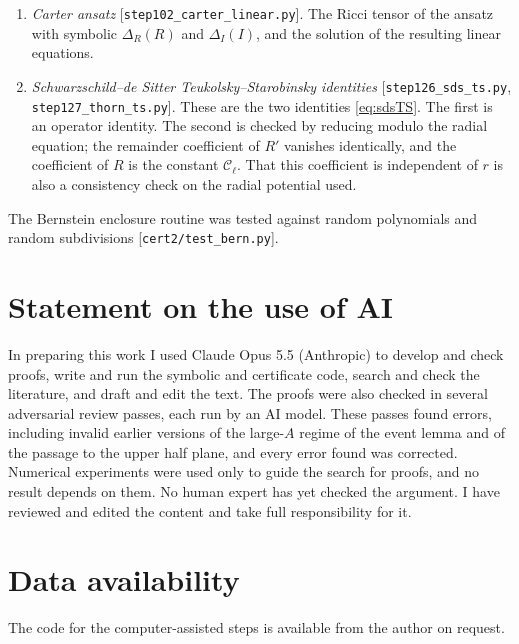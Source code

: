 \documentclass[11pt]{amsart}
\theoremstyle{definition}
\theoremstyle{remark}
\numberwithin{equation}{section}
\begin{document}
\begin{enumerate}[label=C\arabic*.,leftmargin=*]
\texttt{step96\_zeta.py}, \texttt{step97\_r5\_pd\_check.py}]. These are checks of identities that are already
derived by hand; the derivations do not depend on them.
\item \emph{Carter ansatz} [\texttt{step102\_carter\_linear.py}]. The Ricci tensor of the ansatz with symbolic
$\Delta_R(R)$ and $\Delta_I(I)$, and the solution of the resulting linear equations.
\item \emph{Schwarzschild--de Sitter Teukolsky--Starobinsky identities}
[\texttt{step126\_sds\_ts.py}, \texttt{step127\_thorn\_ts.py}]. These are the two identities \eqref{eq:sdsTS}. The
first is an operator identity. The second is checked by reducing modulo the radial equation; the remainder
coefficient of $R'$ vanishes identically, and the coefficient of $R$ is the constant $\mathcal C_\ell$. That this
coefficient is independent of $r$ is also a consistency check on the radial potential used.
\end{enumerate}
The Bernstein enclosure routine was tested against random polynomials and random subdivisions
[\texttt{cert2/test\_bern.py}].

\section*{Statement on the use of AI}
In preparing this work I used Claude Opus 5.5 (Anthropic) to develop and check proofs, write and run the symbolic and
certificate code, search and check the literature, and draft and edit the text. The proofs were also checked in
several adversarial review passes, each run by an AI model. These passes found errors, including invalid earlier
versions of the large-$A$ regime of the event lemma and of the passage to the upper half plane, and every error found
was corrected. Numerical experiments were used only to guide the search for proofs, and no result depends on them.
No human expert has yet checked the argument. I have reviewed and edited the content and take full responsibility
for it.

\section*{Data availability}
The code for the computer-assisted steps is available from the author on request.
\end{document}
